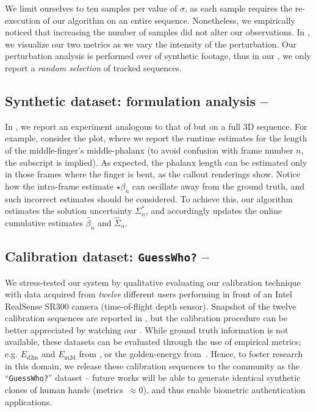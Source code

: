 We limit ourselves to ten samples per value of $\sigma$, as each sample requires the re-execution of our algorithm on an entire sequence. Nonetheless, we empirically noticed that increasing the number of samples did not alter our observations.
In , we visualize our two metrics as we vary the intensity of the perturbation. Our perturbation analysis is performed over  of synthetic footage, thus in our \VideoSynth{}, we only report a \emph{random selection} of tracked sequences.
% 

\subsection{Synthetic dataset: formulation analysis -- }
\label{sec:analysis}
In , we report an experiment analogous to that of  but on a full 3D sequence. For example, consider the {\small \todo{$\beta_{[?]}$}} plot, where we report the runtime estimates for the length of the middle-finger's middle-phalanx (to avoid confusion with frame number $n$, the \todo{$[?]$} subscript is implied).
As expected, the phalanx length can be estimated only in those frames where the finger is bent, as the callout renderings show.
%
Notice how the intra-frame estimate {\small $\star\beta_n$} can oscillate away from the ground truth, and such incorrect estimates should be considered. To achieve this, our algorithm estimates the solution uncertainty {\small $\Sigma^*_n$}, and accordingly updates the online cumulative estimates {\small $\hat\beta_n$} and {\small $\hat\Sigma_n$}.


\subsection{Calibration dataset: \texttt{GuessWho?} -- }
\label{sec:evaldataset}
We stress-tested our system by qualitative evaluating our calibration technique with data acquired from \emph{twelve} different users performing in front of an Intel RealSense SR300 camera (time-of-flight depth sensor). 
Snapshot of the twelve calibration sequences are reported in , but the calibration procedure can be better appreciated by watching our \VideoQualitative{}.
While ground truth information is not available, these datasets can be evaluated through the use of empirical metrics; e.g. $E_\text{d2m}$ and $E_\text{m2d}$ from \cite{tkach2016sphere}, or the golden-energy from~\cite{taylor2016joint}.
Hence, to foster research in this domain, we release these calibration sequences to the community as the ``\texttt{GuessWho?}'' dataset -- future works will be able to generate identical synthetic clones of human hands (metrics~$\approx 0$), and thus enable biometric authentication applications.


